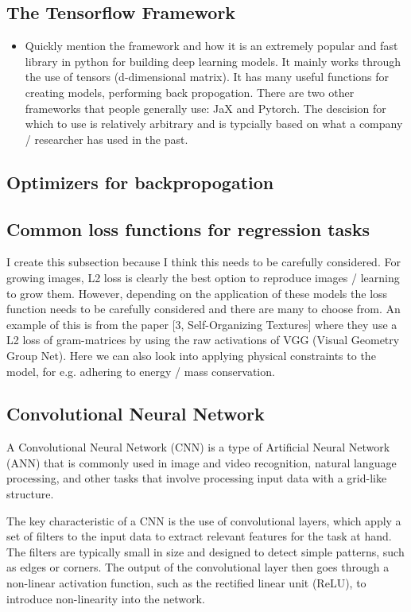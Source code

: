 \subsection{The Tensorflow Framework}
\begin{itemize}
	\item Quickly mention the framework and how it is an extremely popular and fast library in python for building deep learning models. It mainly works through the use of tensors (d-dimensional matrix). It has many useful functions for creating models, performing back propogation. There are two other frameworks that people generally use: JaX and Pytorch. The descision for which to use is relatively arbitrary and is typcially based on what a company / researcher has used in the past.
\end{itemize}
\subsection{Optimizers for backpropogation}
\subsection{Common loss functions for regression tasks}
I create this subsection because I think this needs to be carefully considered. For growing images, L2
loss is clearly the best option to reproduce images / learning to grow them. However, depending on
the application of these models the loss function needs to be carefully considered and there are many
to choose from. An example of this is from the paper [3, Self-Organizing Textures] where they use a
L2 loss of gram-matrices by using the raw activations of VGG (Visual Geometry Group Net).
Here we can also look into applying physical constraints to the model, for e.g. adhering to energy
/ mass conservation.
\subsection{Convolutional Neural Network}

A Convolutional Neural Network (CNN) is a type of Artificial Neural Network (ANN) that is commonly used in image and video recognition, natural language processing, and other tasks that involve processing input data with a grid-like structure.

The key characteristic of a CNN is the use of convolutional layers, which apply a set of filters to the input data to extract relevant features for the task at hand. The filters are typically small in size and designed to detect simple patterns, such as edges or corners. The output of the convolutional layer then goes through a non-linear activation function, such as the rectified linear unit (ReLU), to introduce non-linearity into the network.

